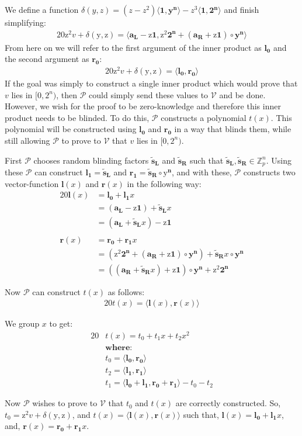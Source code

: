 \documentclass{article}
\newcommand{\eq}[1]{\begin{alignat*}{20}#1\end{alignat*}}
\renewcommand{\vec}[1]{\boldsymbol{#1}}
\newcommand{\ran}[1]{\mathrm{#1}}
\newcommand{\vecran}[1]{\mathbf{#1}}
\newcommand{\V}{\mathcal{V}}
\renewcommand{\P}{\mathcal{P}}
\newcommand{\Z}{\mathbb{Z}}
\newcommand{\dotp}[2]{\langle #1, #2 \rangle}
\newcommand{\opn}[1]{\operatorname{#1}}
\newcommand{\vecl}[1]{\vec{#1_{\opn{L}}}}
\newcommand{\vecr}[1]{\vec{#1_{\opn{R}}}}
\newcommand{\blind}[1]{\widetilde{#1}}
\newcommand{\bs}{\blind{s}}
\begin{document}
We define a function $\delta(y,z) = (z - z^2)\dotp{\vec{1}}{\vec{y^n}}
- z^3\dotp{\vec{1}}{\vec{2^n}}$ and finish simplifying:
\eq{
	\ran{z^2}v + \delta(\ran{y},\ran{z}) = \dotp{\vecl{a} - \ran{z}\vec{1}}{\ran{z^2}\vec{2^n} + (\vecr{a} + \ran{z}\vec{1})\circ\vecran{y}^{\vec{n}}}
}
From here on we will refer to the first argument of the inner product
as $\vec{l_0}$ and the second argument as $\vec{r_0}$:
\eq{
	\ran{z^2}v + \delta(\ran{y},\ran{z}) = \dotp{\vec{l_0}}{\vec{r_0}}
}
If the goal was simply to construct a single inner product which
would prove that $v$ lies in $[0,2^n)$, then $\P$ could simply send
these values to $\V$ and be done. However, we wish for the proof to be
zero-knowledge and therefore this inner product needs to be blinded. To
do this, $\P$ constructs a polynomial $t(x)$. This polynomial will
be constructed using $\vec{l_0}$ and $\vec{r_0}$ in a way that blinds
them, while still allowing $\P$ to prove to $\V$ that $v$ lies in
$[0,2^n)$.

First $\P$ chooses random blinding factors $\vecl{\blind{s}}$ and
$\vecr{\bs}$ such that $\vecl{\bs},\vecr{\bs}\in \Z^n_p$. Using
these $\P$ can construct $\vec{l_1} = \vecl{\bs}$ and $\vec{r_1} =
\vecr{\bs}\circ \vec{\ran{y}^n}$, and with these, $\P$ constructs two
vector-function $\vec{l}(x)$ and $\vec{r}(x)$ in the following way:
\eq{
	\vec{l}(x) &= \vec{l_0} + \vec{l_1}x \\ 
	&= (\vecl{a} - \ran{z}\vec{1}) + \vecl{\bs}x \\ 
	&= (\vecl{a} + \vecl{\bs}x) - \ran{z}\vec{1}\\&\\
	\vec{r}(x) &= \vec{r_0} + \vec{r_1}x \\ 
	&= (\ran{z^2}\vec{2^n} + (\vecr{a} + \ran{z}\vec{1})\circ\vecran{y}^{\vec{n}}) + \vecr{\bs}x\circ\vecran{y}^{\vec{n}} \\ 
	&= ((\vecr{a} + \vecr{\bs}x) + \ran{z}\vec{1}) \circ \vecran{y}^{\vec{n}} + \ran{z}^2\vec{2^n}
}

Now $\P$ can construct $t(x)$ as follows:
\eq{
	t(x) = \dotp{\vec{l}(x)}{\vec{r}(x)}
}

We group $x$ to get:
\eq{
	&t(x) = t_0 + t_1x + t_2x^2 \\
	&\textbf{where:} \\
	&t_0 = \dotp{\vec{l_0}}{\vec{r_0}}\\
	&t_2 = \dotp{\vec{l_1}}{\vec{r_1}}\\
	&t_1 = \dotp{\vec{l_0}+\vec{l_1}}{\vec{r_0} + \vec{r_1}} - t_0 - t_2
}

Now $\P$ wishes to prove to $\V$ that $t_0$ and $t(x)$ are correctly
constructed. So, $t_0 = \ran{z^2}v + \delta(\ran{y},\ran{z})$, and $t(x)
= \dotp{\vec{l}(x)}{\vec{r}(x)}$ such that, $\vec{l}(x) = \vec{l_0}
+ \vec{l_1}x$, and, $\vec{r}(x) = \vec{r_0} + \vec{r_1}x$.
\end{document}
